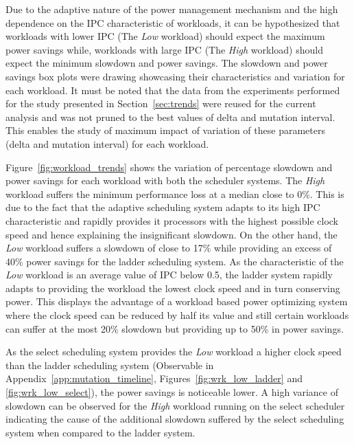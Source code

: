 Due to the adaptive nature of the power management mechanism and the high dependence
on the IPC characteristic of workloads, it can be hypothesized
that workloads with lower IPC (The \textit{Low} workload) should expect the maximum
power savings while, workloads with large IPC (The \textit{High} workload) should
expect the minimum slowdown and power savings.
The slowdown and power savings box plots were drawing showcasing their characteristics and 
variation for each workload. It must be noted that the data from the experiments 
performed for the study presented in Section~\ref{sec:trends} were reused for the 
current analysis and was not pruned to the best values of delta and mutation interval. 
This enables the study of maximum impact of variation of these parameters
(delta and mutation interval) for each workload. 

Figure~\ref{fig:workload_trends} shows the variation of percentage slowdown and power savings 
for each workload with both the scheduler systems. The \textit{High} workload 
suffers the minimum performance loss at a median close to 0\%. This is due to the fact 
that the adaptive scheduling system adapts to its high IPC characteristic and rapidly
provides it processors with the highest possible clock speed and hence explaining 
the insignificant slowdown. On the other hand, the \textit{Low} workload suffers a slowdown
of close to 17\% while providing an excess of 40\% power savings for the ladder scheduling
system. As the characteristic of the \textit{Low} workload is an average value of IPC below 0.5, 
the ladder system rapidly adapts to providing the workload the lowest clock speed and 
in turn conserving power. This displays the advantage of a workload based power optimizing 
system where the clock speed can be reduced by half its value and still certain workloads
can suffer at the most 20\% slowdown but providing up to 50\% in power savings. 

As the select scheduling system provides the \textit{Low} workload a higher clock speed than the 
ladder scheduling system (Observable in Appendix~\ref{app:mutation_timeline}, 
Figures~\ref{fig:wrk_low_ladder} and \ref{fig:wrk_low_select}), the power savings is 
noticeable lower. A high variance of slowdown can be observed for the \textit{High} 
workload running on the select scheduler indicating the cause of the additional slowdown
suffered by the select scheduling system when compared to the ladder system.


